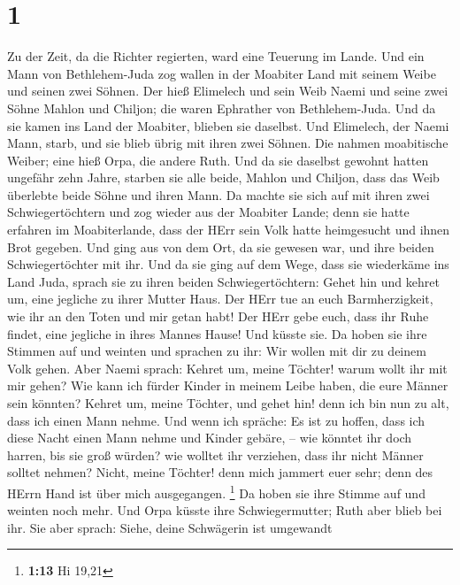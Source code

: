 \hypertarget{section}{%
\section{1}\label{section}}

 Zu der Zeit, da die Richter regierten, ward eine Teuerung
im Lande. Und ein Mann von Bethlehem-Juda zog wallen in der Moabiter
Land mit seinem Weibe und seinen zwei Söhnen.  Der hieß
Elimelech und sein Weib Naemi und seine zwei Söhne Mahlon und Chiljon;
die waren Ephrather von Bethlehem-Juda. Und da sie kamen ins Land der
Moabiter, blieben sie daselbst.  Und Elimelech, der Naemi
Mann, starb, und sie blieb übrig mit ihren zwei Söhnen. 
Die nahmen moabitische Weiber; eine hieß Orpa, die andere Ruth. Und da
sie daselbst gewohnt hatten ungefähr zehn Jahre,  starben
sie alle beide, Mahlon und Chiljon, dass das Weib überlebte beide Söhne
und ihren Mann.  Da machte sie sich auf mit ihren zwei
Schwiegertöchtern und zog wieder aus der Moabiter Lande; denn sie hatte
erfahren im Moabiterlande, dass der HErr sein Volk hatte heimgesucht und
ihnen Brot gegeben.  Und ging aus von dem Ort, da sie
gewesen war, und ihre beiden Schwiegertöchter mit ihr. Und da sie ging
auf dem Wege, dass sie wiederkäme ins Land Juda,  sprach
sie zu ihren beiden Schwiegertöchtern: Gehet hin und kehret um, eine
jegliche zu ihrer Mutter Haus. Der HErr tue an euch Barmherzigkeit, wie
ihr an den Toten und mir getan habt!  Der HErr gebe euch,
dass ihr Ruhe findet, eine jegliche in ihres Mannes Hause! Und küsste
sie. Da hoben sie ihre Stimmen auf und weinten  und
sprachen zu ihr: Wir wollen mit dir zu deinem Volk gehen.
 Aber Naemi sprach: Kehret um, meine Töchter! warum wollt
ihr mit mir gehen? Wie kann ich fürder Kinder in meinem Leibe haben, die
eure Männer sein könnten?  Kehret um, meine Töchter, und
gehet hin! denn ich bin nun zu alt, dass ich einen Mann nehme. Und wenn
ich spräche: Es ist zu hoffen, dass ich diese Nacht einen Mann nehme und
Kinder gebäre, --  wie könntet ihr doch harren, bis sie
groß würden? wie wolltet ihr verziehen, dass ihr nicht Männer solltet
nehmen? Nicht, meine Töchter! denn mich jammert euer sehr; denn des
HErrn Hand ist über mich ausgegangen. \footnote{\textbf{1:13} Hi 19,21}
 Da hoben sie ihre Stimme auf und weinten noch mehr. Und
Orpa küsste ihre Schwiegermutter; Ruth aber blieb bei ihr.
 Sie aber sprach: Siehe, deine Schwägerin ist umgewandt
